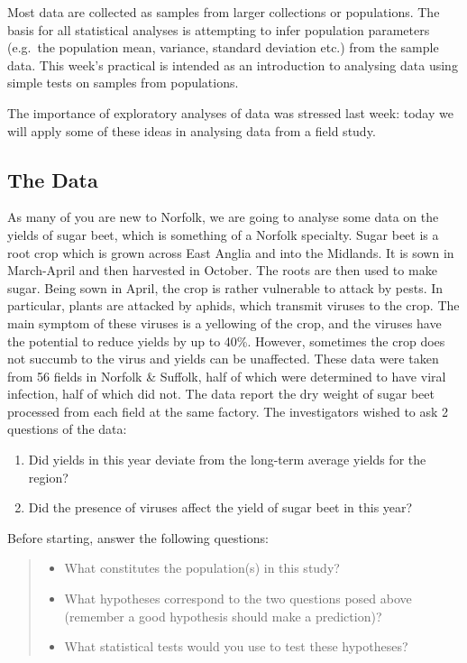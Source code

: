 \documentclass[
]{book}
\providecommand{\tightlist}{%
  \setlength{\itemsep}{0pt}\setlength{\parskip}{0pt}}
\begin{document}
Most data are collected as samples from larger collections or populations. The basis for all statistical analyses is attempting to infer population parameters (e.g.~the population mean, variance, standard deviation etc.) from the sample data. This week's practical is intended as an introduction to analysing data using simple tests on samples from populations.

The importance of exploratory analyses of data was stressed last week: today we will apply some of these ideas in analysing data from a field study.

\hypertarget{the-data}{%
\subsection{The Data}\label{the-data}}

As many of you are new to Norfolk, we are going to analyse some data on the yields of sugar beet, which is something of a Norfolk specialty. Sugar beet is a root crop which is grown across East Anglia and into the Midlands. It is sown in March-April and then harvested in October. The roots are then used to make sugar. Being sown in April, the crop is rather vulnerable to attack by pests. In particular, plants are attacked by aphids, which transmit viruses to the crop. The main symptom of these viruses is a yellowing of the crop, and the viruses have the potential to reduce yields by up to 40\%. However, sometimes the crop does not succumb to the virus and yields can be unaffected.
These data were taken from 56 fields in Norfolk \& Suffolk, half of which were determined to have viral infection, half of which did not. The data report the dry weight of sugar beet processed from each field at the same factory. The investigators wished to ask 2 questions of the data:

\begin{enumerate}
\def\labelenumi{\arabic{enumi})}
\tightlist
\item
  Did yields in this year deviate from the long-term average yields for the region?
\item
  Did the presence of viruses affect the yield of sugar beet in this year?
\end{enumerate}

Before starting, answer the following questions:

\begin{quote}
\begin{itemize}
\tightlist
\item
  What constitutes the population(s) in this study?
\item
  What hypotheses correspond to the two questions posed above (remember a good hypothesis should make a prediction)?
\item
  What statistical tests would you use to test these hypotheses?
\end{itemize}
\end{quote}
\end{document}
